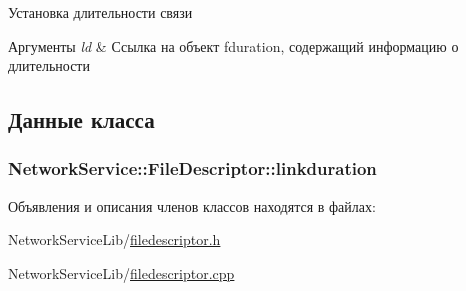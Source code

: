 Установка длительности связи 


\begin{DoxyParams}{Аргументы}
{\em ld} & Ссылка на объект fduration, содержащий информацию о длительности \\
\hline
\end{DoxyParams}


\subsection{Данные класса}
\hypertarget{class_network_service_1_1_file_descriptor_a1ce56aef66c93f0a6a5eebc8d43c4bb8}{}
\subsubsection[{linkduration}]{ Network\+Service\+::\+File\+Descriptor\+::linkduration\hspace{0.3cm}{\ttfamily [private]}}\label{class_network_service_1_1_file_descriptor_a1ce56aef66c93f0a6a5eebc8d43c4bb8}


Объявления и описания членов классов находятся в файлах\+:\begin{DoxyCompactItemize}
\item 
Network\+Service\+Lib/\hyperlink{filedescriptor_8h}{filedescriptor.\+h}\item 
Network\+Service\+Lib/\hyperlink{filedescriptor_8cpp}{filedescriptor.\+cpp}\end{DoxyCompactItemize}
